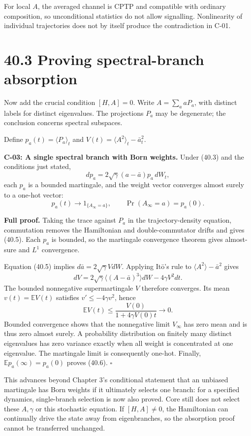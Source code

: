 \documentclass[
  11pt,
  oneside]{book}
\begin{document}
For local \(A\), the averaged channel is CPTP and compatible with
ordinary composition, so unconditional statistics do not allow
signalling. Nonlinearity of individual trajectories does not by itself
produce the contradiction in C-01.

\section{40.3 Proving spectral-branch absorption}

Now add the crucial condition \([H,A]=0\). Write \(A=\sum_a aP_a\), with
distinct labels for distinct eigenvalues. The projections \(P_a\) may be
degenerate; the conclusion concerns spectral subspaces.

Define \(p_a(t)=\langle P_a\rangle_t\) and
\(V(t)=\langle A^2\rangle_t-\bar a_t^2\).

\label{c-03}{}

\textbf{C-03: A single spectral branch with Born weights.} Under (40.3)
and the conditions just stated, \[
dp_a=2\sqrt\gamma(a-\bar a)p_a\,dW_t,
\tag{40.5}
\] each \(p_a\) is a bounded martingale, and the weight vector converges
almost surely to a one-hot vector: \[
p_a(t)\longrightarrow 1_{\{A_\infty=a\}},\qquad
\Pr(A_\infty=a)=p_a(0).
\tag{40.6}
\]

\textbf{Full proof.} Taking the trace against \(P_a\) in the
trajectory-density equation, commutation removes the Hamiltonian and
double-commutator drifts and gives (40.5). Each \(p_a\) is bounded, so
the martingale convergence theorem gives almost-sure and \(L^1\)
convergence.

Equation (40.5) implies \(d\bar a=2\sqrt\gamma VdW\). Applying Itō's
rule to \(\langle A^2\rangle-\bar a^2\) gives \[
dV=2\sqrt\gamma\langle(A-\bar a)^3\rangle dW
-4\gamma V^2dt.
\tag{40.7}
\] The bounded nonnegative supermartingale \(V\) therefore converges.
Its mean \(v(t)=\mathbb EV(t)\) satisfies \(v'\le-4\gamma v^2\), hence
\[
\mathbb EV(t)\le\frac{V(0)}{1+4\gamma V(0)t}\longrightarrow0.
\tag{40.8}
\] Bounded convergence shows that the nonnegative limit \(V_\infty\) has
zero mean and is thus zero almost surely. A probability distribution on
finitely many distinct eigenvalues has zero variance exactly when all
weight is concentrated at one eigenvalue. The martingale limit is
consequently one-hot. Finally, \(\mathbb E p_a(\infty)=p_a(0)\) proves
(40.6). \(\square\)

This advances beyond Chapter 3's conditional statement that an unbiased
martingale has Born weights if it ultimately selects one branch: for a
specified dynamics, single-branch selection is now also proved. Core
still does not select these \(A,\gamma\) or this stochastic equation. If
\([H,A]\ne0\), the Hamiltonian can continually drive the state away from
eigenbranches, so the absorption proof cannot be transferred unchanged.
\end{document}
